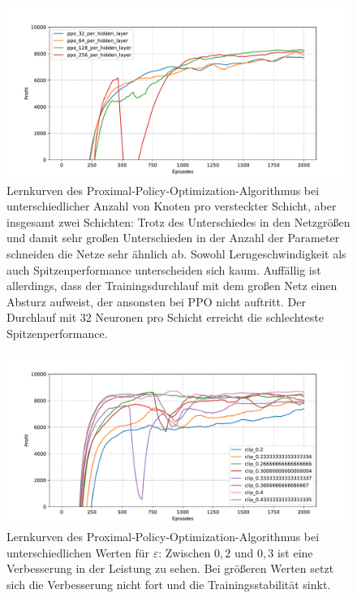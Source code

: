 \begin{figure}[htb]
	\centering
	\includegraphics[width=\textwidth]{appendix/ppo_different_networks.pdf}
	\caption{
		Lernkurven des Proximal-Policy-Optimization-Algorithmus bei unterschiedlicher Anzahl von Knoten pro versteckter Schicht, aber insgesamt zwei Schichten:
        Trotz des Unterschiedes in den Netzgrößen und damit sehr großen Unterschieden in der Anzahl der Parameter schneiden die Netze sehr ähnlich ab.
        Sowohl Lerngeschwindigkeit als auch Spitzenperformance unterscheiden sich kaum.
        Auffällig ist allerdings, dass der Trainingsdurchlauf mit dem großen Netz einen Absturz aufweist, der ansonsten bei PPO nicht auftritt.
        Der Durchlauf mit 32 Neuronen pro Schicht erreicht die schlechteste Spitzenperformance.
	}
	\label{graphic:PPODifferentNetworks}
\end{figure}
\begin{figure}[htb]
	\centering
	\includegraphics[width=\textwidth]{appendix/ppo_different_clipping.pdf}
	\caption{
		Lernkurven des Proximal-Policy-Optimization-Algorithmus bei unterschiedlichen Werten für $\varepsilon$:
		Zwischen $0{,}2$ und $0{,}3$ ist eine Verbesserung in der Leistung zu sehen.
		Bei größeren Werten setzt sich die Verbesserung nicht fort und die Trainingsstabilität sinkt.
	}
	\label{graphic:PPODifferentClipping}
\end{figure}
